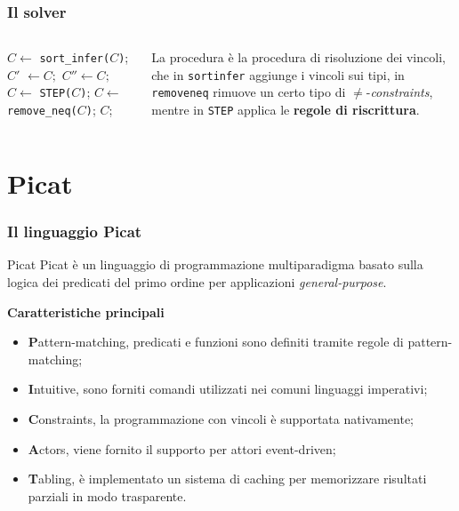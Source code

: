 \documentclass{beamer}
\begin{document}
\begin{frame}
  \frametitle{Il solver \satset{}}
  \begin{columns}[c]

    \begin{algorithmic}[1]
      \State $C \gets $ \texttt{sort\_infer($C$)};
      \Repeat
      \State $C'$ $\gets C;$
      \Repeat
      \State $C'' \gets C;$
      \State $C \gets $ \texttt{STEP($C$)};
      \State $C \gets $ \texttt{remove\_neq($C$)};
      \State
      \State\Return $C$;
      \EndProcedure
    \end{algorithmic}

    La procedura \satset{} è la procedura di risoluzione dei vincoli,
    che in \texttt{sort\textunderscore infer} aggiunge i vincoli sui
    tipi, in \texttt{remove\textunderscore neq} rimuove un certo tipo
    di $\neq$-\textit{constraints}, mentre in \texttt{STEP} applica le
    \textbf{regole di riscrittura}.
  \end{columns}
\end{frame}

\section{Picat}

\begin{frame}
  \frametitle{Il linguaggio Picat}
  \begin{block}{Picat}
    Picat è un linguaggio di programmazione multiparadigma basato
    sulla logica dei predicati del primo ordine per applicazioni
    \emph{general-purpose}.
  \end{block}
  \medskip
  \textbf{Caratteristiche principali}
  \begin{itemize}
  \item \textbf{P}attern-matching, predicati e funzioni sono definiti
    tramite regole di pattern-matching;
  \item \textbf{I}ntuitive, sono forniti comandi utilizzati nei comuni
    linguaggi imperativi;
  \item \textbf{C}onstraints, la programmazione con vincoli è
    supportata nativamente;
  \item \textbf{A}ctors, viene fornito il supporto per attori
    event-driven;
  \item \textbf{T}abling, è implementato un sistema di caching per
    memorizzare risultati parziali in modo trasparente.
  \end{itemize}
\end{frame}
\end{document}
